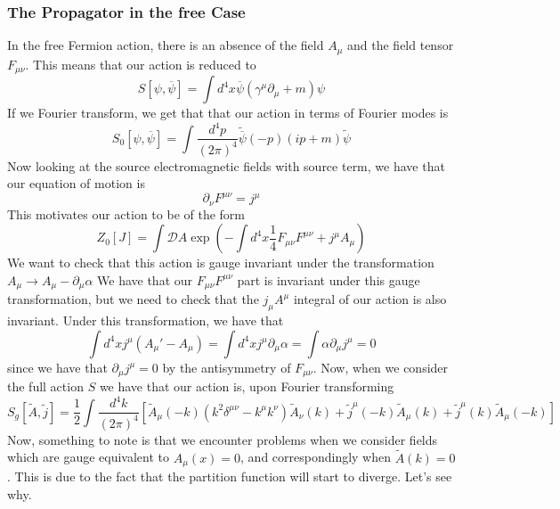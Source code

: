 \documentclass[11pt, oneside]{article}   	%
\theoremstyle{slanted}
\begin{document}
\subsubsection{The Propagator in the free Case}
In the free Fermion action, there is an absence 
of the field $ A _ \mu $ and the field tensor $ F _{ \mu \nu  }$.
This means that our action is reduced to 
\[
S \left[  \psi , \overline{ \psi }  \right]   = 
\int d ^ 4 x \overline{ \psi } \left( \gamma ^ \mu \partial  _ \mu + m  \right) \psi 
\]  If we Fourier 
transform, we get that that our action in terms of Fourier modes 
is \[
S _ 0 \left[  \psi , \overline{ \psi }  \right]   = 
\int \frac{d ^ 4 p }{ \left( 2 \pi  \right)  ^ 4 } \tilde{\overline{\psi }  } \left( - p  \right)   
\left( i p + m  \right)  \tilde{ \psi } 
\]
Now looking 
at the source electromagnetic fields with source term, 
we have that our equation of motion is 
\[
\partial  _ \nu F ^{ \mu \nu }  = j ^ \mu 
\] This motivates our 
action to be of the form 
\[
Z_ 0 \left[  J \right]   = 
\int \mathcal{ D } A \exp \left(  - \int d ^ 4 x \frac{1}{4 } F _{ \mu \nu } F ^{ \mu \nu } + j ^ \mu A _ \mu   \right) 
\] We want to 
check that this action is gauge invariant under 
the transformation 
$ A _ \mu \to A _ \mu - \partial  _ \mu \alpha $
We have that our $ F_{ \mu \nu } F ^{ \mu \nu } $ part 
is invariant under this gauge transformation, 
but we need to check that the  $ j _ \mu A ^ \mu $ 
integral of our action is also invariant. 
Under this transformation, we
have that 
\[
\int d ^ 4 x j ^\mu \left( A _ \mu ' 
- A _ \mu \right)   = \int d ^ 4 x j ^ \mu \partial  _ \mu \alpha 
= \int \alpha \partial  _ \mu j ^ \mu  =0 
\] since we have that $ \partial  _ \mu j ^ \mu  =0 $ 
by the antisymmetry of $ F _{ \mu \nu  } $. 
Now, when we consider the 
full action $ S $
we have that our action is, upon Fourier 
transforming 
\[
S _ g \left[ \tilde{ A }, \tilde{ j }    \right] 
= \frac{1}{2 } \int \frac{d ^ 4 k }{ \left( 2 \pi  \right)  ^  4} 
\left[  \tilde{A } _ \mu \left( - k  \right)  \left( k ^ 2 
\delta ^{ \mu \nu } - k ^ \mu k ^ \nu \right)  \tilde{A } _ \nu \left( k  \right)  
+ \tilde{ j } ^{ \mu } \left( -k  \right)  \tilde{ A } _ \mu \left( k  \right)  
+ \tilde{ j } ^ \mu \left( k  \right)  \tilde{ A } _ \mu \left( - k  \right)     \right] 
\] Now, something to note is that 
we encounter problems when we consider 
fields which are gauge equivalent to 
$ A _ \mu \left( x  \right)  = 0 $, and correspondingly when 
$ \tilde{ A } \left( k  \right)   = 0 	$. 
This is due to the fact that the partition function will 
start to diverge. Let's see why. 
\end{document}
